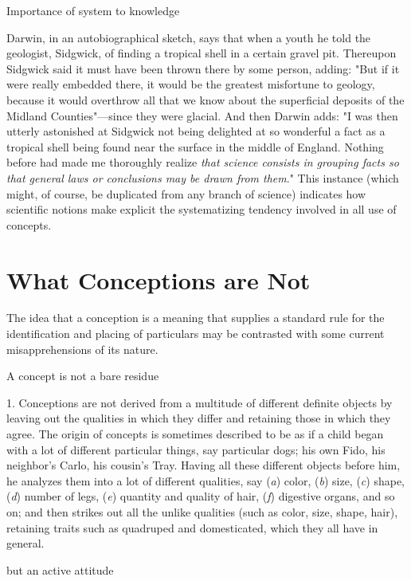 \documentclass[letterpaper]{book}
\begin{document}
Importance of system to knowledge

Darwin, in an autobiographical sketch, says that when a youth he told
the geologist, Sidgwick, of finding a tropical shell in a certain gravel
pit. Thereupon Sidgwick said it must have been thrown there by some
person, adding: "But if it were really embedded there, it would be the
greatest misfortune to geology, because it would overthrow all that we
know about the superficial deposits of the Midland Counties"---since
they were glacial. And then Darwin adds: "I was then utterly astonished
at Sidgwick not being delighted at so wonderful a fact as a tropical
shell being found near the surface in the middle of England. Nothing
before had made me thoroughly realize \emph{that science consists in
grouping facts so that general laws or conclusions may be drawn from
them}." This instance (which might, of course, be duplicated from any
branch of science) indicates how scientific notions make explicit the
systematizing tendency involved in all use of concepts.

\section{What Conceptions are Not}

The idea that a conception is a meaning that supplies a standard rule
for the identification and placing of particulars may be contrasted with
some current misapprehensions of its nature.

A concept is not a bare residue

1. Conceptions are not derived from a multitude
of
different definite objects by leaving out the qualities in which they
differ and retaining those in which they agree. The origin of concepts
is sometimes described to be as if a child began with a lot of different
particular things, say particular dogs; his own Fido, his neighbor's
Carlo, his cousin's Tray. Having all these different objects before him,
he analyzes them into a lot of different qualities, say (\emph{a})
color, (\emph{b}) size, (\emph{c}) shape, (\emph{d}) number of legs,
(\emph{e}) quantity and quality of hair, (\emph{f}) digestive organs,
and so on; and then strikes out all the unlike qualities (such as color,
size, shape, hair), retaining traits such as quadruped and domesticated,
which they all have in general.

but an active attitude
\end{document}
